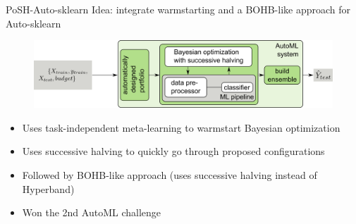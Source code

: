 \begin{frame}[c]{PoSH-Auto-sklearn }
Idea: integrate warmstarting and a BOHB-like approach for Auto-sklearn

\begin{figure}
    \centering
    \includegraphics[width=\textwidth]{images/success_stories/automl_bo_po_es.png}
\end{figure}
\pause

\begin{itemize}
    \item Uses task-independent meta-learning to warmstart Bayesian optimization
\pause
    \item Uses successive halving to quickly go through proposed configurations
\pause
    \item Followed by BOHB-like approach (uses successive halving instead of Hyperband)
    \item Won the 2nd AutoML challenge
\end{itemize}

\end{frame}

